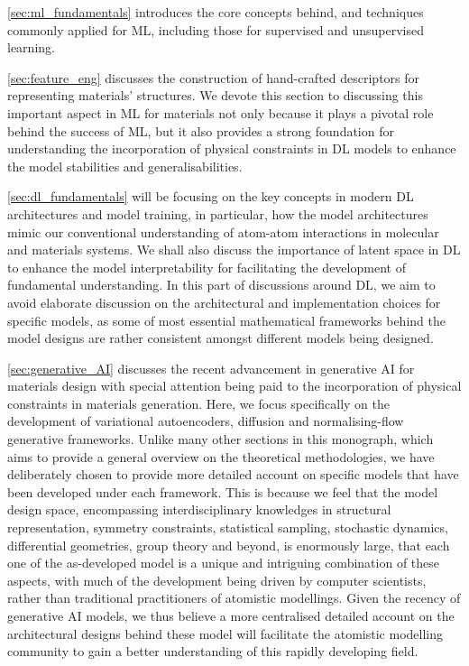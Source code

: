 \cref{sec:ml_fundamentals} introduces the core concepts behind,  and techniques commonly applied for ML, including those for supervised and unsupervised learning. 

\cref{sec:feature_eng} discusses the construction of hand-crafted descriptors for representing materials' structures. We devote this section to discussing this important aspect in ML for materials not only because it plays a pivotal role behind the success of ML, but it also provides a strong foundation for understanding the incorporation of physical constraints in DL models to enhance the model stabilities and generalisabilities. 

\cref{sec:dl_fundamentals} will be focusing on the key concepts in modern DL architectures and model training, in particular, how the model architectures mimic our conventional understanding of atom-atom interactions in molecular and materials systems. We shall also discuss the importance of latent space in DL to enhance the model interpretability for facilitating the development of fundamental understanding. In this part of discussions around DL, we aim to avoid elaborate discussion on the architectural and implementation choices for specific models, as some of most essential mathematical frameworks behind the model designs are rather consistent amongst different models being designed. 

\cref{sec:generative_AI} discusses the recent advancement in generative AI for materials design with special attention being paid to the incorporation of physical constraints in materials generation. Here, we focus specifically on the development of variational autoencoders, diffusion and normalising-flow generative frameworks. Unlike many other sections in this monograph, which aims to provide a general overview on the theoretical methodologies, we have deliberately chosen  to provide more detailed account on specific models that have been developed under each framework. This is because we feel that the model design space, encompassing interdisciplinary knowledges in structural representation, symmetry constraints, statistical sampling, stochastic dynamics, differential geometries, group theory and beyond, is enormously large, that each one of the as-developed model is a unique and intriguing combination of these aspects, with much of the development being driven by computer scientists, rather than traditional practitioners of atomistic modellings. Given the recency of generative AI models, we thus believe a more centralised detailed account on the architectural designs behind these model will facilitate the atomistic modelling community to gain a better understanding of this rapidly developing field.


